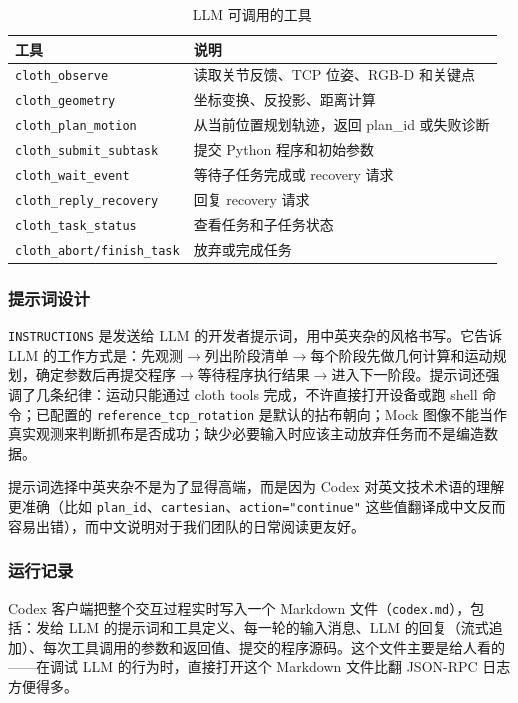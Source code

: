 \begin{table}[H]
\centering
\caption{LLM 可调用的工具}
\label{tab:agent-tools}
\small
\begin{tabular}{@{}lp{8.5cm}@{}}
  \toprule
  工具 & 说明 \\
  \midrule
  \texttt{cloth\_observe} & 读取关节反馈、TCP 位姿、RGB-D 和关键点 \\
  \texttt{cloth\_geometry} & 坐标变换、反投影、距离计算 \\
  \texttt{cloth\_plan\_motion} & 从当前位置规划轨迹，返回 plan\_id 或失败诊断 \\
  \texttt{cloth\_submit\_subtask} & 提交 Python 程序和初始参数 \\
  \texttt{cloth\_wait\_event} & 等待子任务完成或 recovery 请求 \\
  \texttt{cloth\_reply\_recovery} & 回复 recovery 请求 \\
  \texttt{cloth\_task\_status} & 查看任务和子任务状态 \\
  \texttt{cloth\_abort/finish\_task} & 放弃或完成任务 \\
  \bottomrule
\end{tabular}
\end{table}

\subsubsection{提示词设计}

\texttt{INSTRUCTIONS} 是发送给 LLM 的开发者提示词，用中英夹杂的风格书写。它告诉 LLM 的工作方式是：先观测$\to$列出阶段清单$\to$每个阶段先做几何计算和运动规划，确定参数后再提交程序$\to$等待程序执行结果$\to$进入下一阶段。提示词还强调了几条纪律：运动只能通过 cloth tools 完成，不许直接打开设备或跑 shell 命令；已配置的 \texttt{reference\_tcp\_rotation} 是默认的拈布朝向；Mock 图像不能当作真实观测来判断抓布是否成功；缺少必要输入时应该主动放弃任务而不是编造数据。

提示词选择中英夹杂不是为了显得高端，而是因为 Codex 对英文技术术语的理解更准确（比如 \texttt{plan\_id}、\texttt{cartesian}、\texttt{action="continue"} 这些值翻译成中文反而容易出错），而中文说明对于我们团队的日常阅读更友好。

\subsubsection{运行记录}

Codex 客户端把整个交互过程实时写入一个 Markdown 文件（\texttt{codex.md}），包括：发给 LLM 的提示词和工具定义、每一轮的输入消息、LLM 的回复（流式追加）、每次工具调用的参数和返回值、提交的程序源码。这个文件主要是给人看的——在调试 LLM 的行为时，直接打开这个 Markdown 文件比翻 JSON-RPC 日志方便得多。


